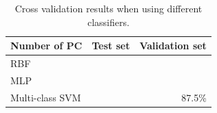 \begin{table}
\begin{center}
\begin{tabular}{| l | r | r |}
\hline
Number of PC & Test set & Validation set \\ \hline
RBF & &  \\
MLP & &  \\
Multi-class SVM & & 87.5\% \\
\hline
\end{tabular}
\end{center}
\caption{Cross validation results when using different classifiers.}
\label{tab:pca}
\end{table}
